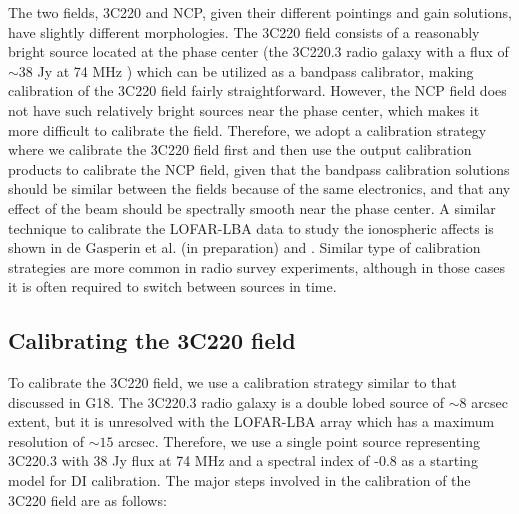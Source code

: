 \documentclass[fleqn,usenatbib]{mnras}
\begin{document}
The two fields, 3C220 and NCP, given their different pointings and gain solutions, have slightly different morphologies. The 3C220 field consists of a reasonably bright source located at the phase center (the 3C220.3 radio galaxy with a flux of $\sim 38$ Jy at 74 MHz \citep{cohen2007}) which can be utilized as a bandpass calibrator, making calibration of the 3C220 field fairly straightforward. However, the NCP field does not have such relatively bright sources near the phase center, which makes it more difficult to calibrate the field. Therefore, we adopt a calibration strategy where we calibrate the 3C220 field first and then use the output calibration products to calibrate the NCP field, given that the bandpass calibration solutions should be similar between the fields because of the same electronics, and that any effect of the beam should be spectrally smooth near the phase center. A similar technique to calibrate the LOFAR-LBA data to study the ionospheric affects is shown in de Gasperin et al. (in preparation) and \cite{degasperin2018}. Similar type of calibration strategies are more common in radio survey experiments, although in those cases it is often required to switch between sources in time. 

\subsection{Calibrating the 3C220 field}\label{subsec:3C220cal}
To calibrate the 3C220 field, we use a calibration strategy similar to that discussed in G18. The 3C220.3 radio galaxy is a double lobed source of $\sim 8$ arcsec extent, but it is unresolved with the LOFAR-LBA array which has a maximum resolution of $\sim 15$ arcsec. Therefore, we use a single point source  representing 3C220.3 with $38$ Jy flux at 74 MHz \citep{cohen2007} and a spectral index of -0.8 as a starting model for DI calibration. The major steps involved in the calibration of the 3C220 field are as follows:
\end{document}
